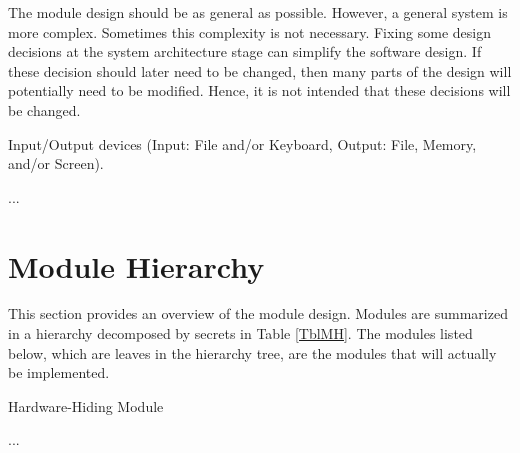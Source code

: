 \documentclass[12pt, titlepage]{article}
\newcounter{ucnum}
\newcommand{\uctheucnum}{UC\theucnum}
\newcounter{mnum}
\newcommand{\mthemnum}{M\themnum}
\begin{document}
The module design should be as general as possible. However, a general system is more complex.
Sometimes this complexity is not necessary. Fixing some design decisions at the system architecture
stage can simplify the software design. If these decision should later need to be changed, then
many parts of the design will potentially need to be modified. Hence, it is not intended that these
decisions will be changed.

\begin{description}
  \item[ \uctheucnum \label{ucIO}:] Input/Output devices
    (Input: File and/or Keyboard, Output: File, Memory, and/or Screen).
  \item ...
\end{description}

\section{Module Hierarchy} \label{SecMH}

This section provides an overview of the module design. Modules are summarized in a hierarchy
decomposed by secrets in Table \ref{TblMH}. The modules listed below, which are leaves in the
hierarchy tree, are the modules that will actually be implemented.

\begin{description}
  \item [ \mthemnum \label{mHH}:] Hardware-Hiding Module
  \item ...
\end{description}
\end{document}
